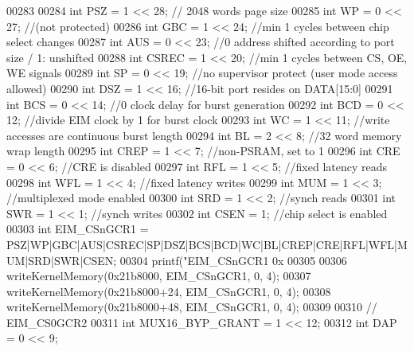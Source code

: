 \begin{DoxyCode}
{{{{00283 
00284     \textcolor{keywordtype}{int} PSZ = 1 << 28; \textcolor{comment}{// 2048 words page size}
00285     \textcolor{keywordtype}{int} WP = 0 << 27; \textcolor{comment}{//(not protected)}
00286     \textcolor{keywordtype}{int} GBC = 1 << 24; \textcolor{comment}{//min 1 cycles between chip select changes}
00287     \textcolor{keywordtype}{int} AUS = 0 << 23; \textcolor{comment}{//0 address shifted according to port size / 1: unshifted}
00288     \textcolor{keywordtype}{int} CSREC = 1 << 20; \textcolor{comment}{//min 1 cycles between CS, OE, WE signals}
00289     \textcolor{keywordtype}{int} SP = 0 << 19; \textcolor{comment}{//no supervisor protect (user mode access allowed)}
00290     \textcolor{keywordtype}{int} DSZ = 1 << 16; \textcolor{comment}{//16-bit port resides on DATA[15:0]}
00291     \textcolor{keywordtype}{int} BCS = 0 << 14; \textcolor{comment}{//0 clock delay for burst generation}
00292     \textcolor{keywordtype}{int} BCD = 0 << 12; \textcolor{comment}{//divide EIM clock by 1 for burst clock}
00293     \textcolor{keywordtype}{int} WC = 1 << 11; \textcolor{comment}{//write accesses are continuous burst length}
00294     \textcolor{keywordtype}{int} BL = 2 << 8; \textcolor{comment}{//32 word memory wrap length}
00295     \textcolor{keywordtype}{int} CREP = 1 << 7; \textcolor{comment}{//non-PSRAM, set to 1}
00296     \textcolor{keywordtype}{int} CRE = 0 << 6; \textcolor{comment}{//CRE is disabled}
00297     \textcolor{keywordtype}{int} RFL = 1 << 5; \textcolor{comment}{//fixed latency reads}
00298     \textcolor{keywordtype}{int} WFL = 1 << 4; \textcolor{comment}{//fixed latency writes}
00299     \textcolor{keywordtype}{int} MUM = 1 << 3; \textcolor{comment}{//multiplexed mode enabled}
00300     \textcolor{keywordtype}{int} SRD = 1 << 2; \textcolor{comment}{//synch reads}
00301     \textcolor{keywordtype}{int} SWR = 1 << 1; \textcolor{comment}{//synch writes}
00302     \textcolor{keywordtype}{int} CSEN = 1; \textcolor{comment}{//chip select is enabled}
00303     \textcolor{keywordtype}{int} EIM\_CSnGCR1 = PSZ|WP|GBC|AUS|CSREC|SP|DSZ|BCS|BCD|WC|BL|CREP|CRE|RFL|WFL|MUM|SRD|SWR|CSEN;
00304     printf(\textcolor{stringliteral}{"EIM\_CSnGCR1 0x%
00305 
00306     writeKernelMemory(0x21b8000, EIM\_CSnGCR1, 0, 4);
00307     writeKernelMemory(0x21b8000+24, EIM\_CSnGCR1, 0, 4);
00308     writeKernelMemory(0x21b8000+48, EIM\_CSnGCR1, 0, 4);
00309 
00310     \textcolor{comment}{// EIM\_CS0GCR2}
00311     \textcolor{keywordtype}{int} MUX16\_BYP\_GRANT = 1 << 12;
00312     \textcolor{keywordtype}{int} DAP = 0 << 9;
}}}}}
\end{DoxyCode}
